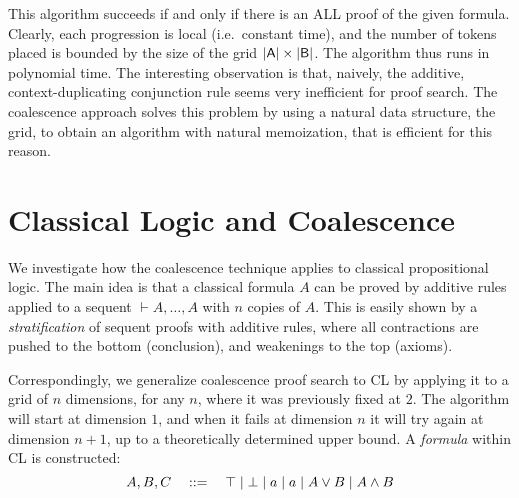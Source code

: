 \documentclass{article}
\begin{document}
        This algorithm succeeds if and only if there is an ALL proof of the given formula.
        Clearly, each progression is local (i.e.\ constant time), and the number of tokens placed is bounded by the size of the grid $\mathsf{|A|}\times\mathsf{|B|}$.
        The algorithm thus runs in polynomial time.
        The interesting observation is that, naively, the additive, context-duplicating conjunction rule seems very inefficient for proof search.
        The coalescence approach solves this problem by using a natural data structure, the grid, to obtain an algorithm with natural memoization, that is efficient for this reason.



    \section*{Classical Logic and Coalescence}
        We investigate how the coalescence technique applies to classical propositional logic.
        The main idea is that a classical formula $A$ can be proved by additive rules applied to a sequent $\vdash A,\dots,A$ with $n$ copies of $A$.
        This is easily shown by a \emph{stratification} of sequent proofs with additive rules, where all contractions are pushed to the bottom (conclusion), and weakenings to the top (axioms).

        Correspondingly, we generalize coalescence proof search to CL by applying it to a grid of $n$ dimensions, for any $n$, where it was previously fixed at $2$.
        The algorithm will start at dimension $1$, and when it fails at dimension $n$ it will try again at dimension $n+1$, up to a theoretically determined upper bound.
        A \emph{formula} within CL is constructed:
        \begin{equation*}
            A, B, C \quad ::= \quad \top \mid \bot \mid a \mid  a \mid A \vee B \mid A \wedge B
        \end{equation*}
\end{document}
